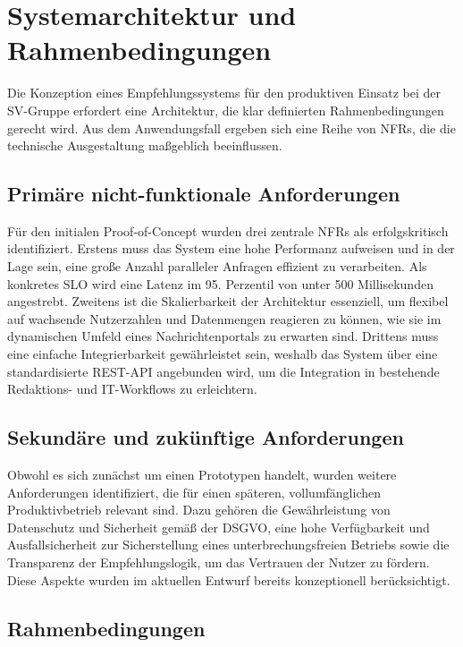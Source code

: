 \section{Systemarchitektur und Rahmenbedingungen}

Die Konzeption eines Empfehlungssystems für den produktiven Einsatz bei der SV-Gruppe erfordert eine Architektur, die klar definierten Rahmenbedingungen gerecht wird. 
Aus dem Anwendungsfall ergeben sich eine Reihe von \ac{NFR}s, die die technische Ausgestaltung maßgeblich beeinflussen.

\subsection{Primäre nicht-funktionale Anforderungen}
\label{sec:nfr}
Für den initialen Proof-of-Concept wurden drei zentrale NFRs als erfolgskritisch identifiziert. 
Erstens muss das System eine hohe Performanz aufweisen und in der Lage sein, eine große Anzahl paralleler Anfragen effizient zu verarbeiten. 
Als konkretes \ac{SLO} wird eine Latenz im 95. Perzentil von unter 500 Millisekunden angestrebt. 
Zweitens ist die Skalierbarkeit der Architektur essenziell, um flexibel auf wachsende Nutzerzahlen und Datenmengen reagieren zu können, 
wie sie im dynamischen Umfeld eines Nachrichtenportals zu erwarten sind. Drittens muss eine einfache Integrierbarkeit gewährleistet sein, 
weshalb das System über eine standardisierte REST-API angebunden wird, um die Integration in bestehende Redaktions- und IT-Workflows zu erleichtern.

\subsection{Sekundäre und zukünftige Anforderungen}
Obwohl es sich zunächst um einen Prototypen handelt, wurden weitere Anforderungen identifiziert, die für einen späteren, 
vollumfänglichen Produktivbetrieb relevant sind. Dazu gehören die Gewährleistung von Datenschutz und Sicherheit gemäß der \ac{DSGVO}, 
eine hohe Verfügbarkeit und Ausfallsicherheit zur Sicherstellung eines unterbrechungsfreien Betriebs sowie die Transparenz der Empfehlungslogik, 
um das Vertrauen der Nutzer zu fördern. Diese Aspekte wurden im aktuellen Entwurf bereits konzeptionell berücksichtigt.

\subsection{Rahmenbedingungen}


